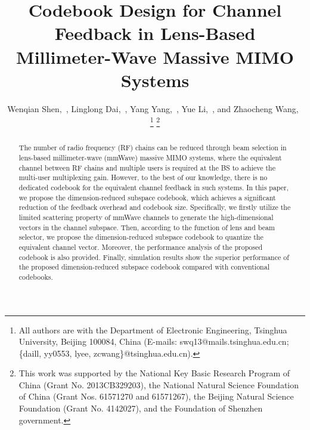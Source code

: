 \documentclass[10pt,twocolumn,twoside]{IEEEtran}
\begin{document}
\title{Codebook Design for Channel Feedback in Lens-Based Millimeter-Wave Massive MIMO Systems}
%
\author{\vspace{-0mm}}
\author{Wenqian Shen,~,
Linglong Dai,~, Yang Yang,~, Yue Li,~, and Zhaocheng Wang,~
\thanks{All authors are with the Department of Electronic Engineering, Tsinghua University, Beijing 100084, China (E-mails: swq13@mails.tsinghua.edu.cn;
 \{daill, yy0553, lyee, zcwang\}@tsinghua.edu.cn).}
\thanks{This work was supported by the National Key Basic Research Program of China (Grant No. 2013CB329203),  the National Natural Science Foundation of China (Grant Nos. 61571270 and 61571267),  the Beijing Natural Science Foundation (Grant No. 4142027), and the Foundation of Shenzhen government.}
}
\maketitle
\begin{abstract}
The number of radio frequency (RF) chains can be reduced through beam selection in lens-based millimeter-wave (mmWave) massive MIMO systems, where the equivalent channel between RF chains and multiple users is required at the BS to achieve the multi-user multiplexing gain.  
However, to the best of our knowledge, there is no dedicated codebook for the equivalent channel feedback in such systems.
In this paper,
we propose the dimension-reduced subspace codebook,
which achieves a significant reduction of the feedback overhead and codebook size.
Specifically, we firstly utilize the limited scattering property of mmWave channels to generate the high-dimensional vectors in the channel subspace.
Then, according to the function of lens and beam selector,
we propose the dimension-reduced subspace codebook to quantize the equivalent channel vector.
Moreover, the performance analysis of the proposed codebook is also provided.
Finally, simulation results show the superior performance of the proposed dimension-reduced subspace codebook compared with conventional codebooks.
\end{abstract}
\end{document}
